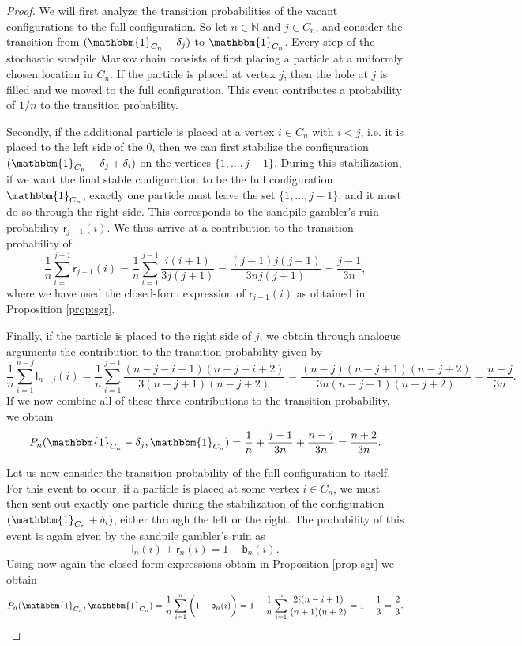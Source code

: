 \documentclass[11pt]{article}
\newcommand{\N}{\mathbb{N}}
\newcommand{\one}{\mathbbm{1}}
\newcommand{\sgrleft}[2]{\mathsf{l}_{#1}(#2)}
\newcommand{\sgrright}[2]{\mathsf{r}_{#1}(#2)}
\newcommand{\sgrboth}[2]{\mathsf{b}_{#1}(#2)}
\newcommand{\trans}[1]{P_{#1}}
\begin{document}
\begin{proof}
    We will first analyze the transition probabilities of the vacant configurations to the full configuration. So let $n\in\N$ and $j\in C_n$, and consider the transition from $(\one_{C_n}-\delta_j)$ to $\one_{C_n}$. Every step of the stochastic sandpile Markov chain consists of first placing a particle at a uniformly chosen location in $C_n$. If the particle is placed at vertex $j$, then the hole at $j$ is filled and we moved to the full configuration. This event contributes a probability of $1/n$ to the transition probability.

    Secondly, if the additional particle is placed at a vertex $i\in C_n$ with $i<j$, i.e. it is placed to the left side of the $0$, then we can first stabilize the configuration $(\one_{C_n}-\delta_j+\delta_i)$ on the vertices $\{1,...,j-1\}.$ During this stabilization, if we want the final stable configuration to be the full configuration $\one_{C_n}$, exactly one particle must leave the set $\{1,...,j-1\}$, and it must do so through the right side. This corresponds to the sandpile gambler's ruin probability $\sgrright{j-1}{i}$. We thus arrive at a contribution to the transition probability of
    $$\frac{1}{n}\sum_{i=1}^{j-1}\sgrright{j-1}{i}=\frac{1}{n}\sum_{i=1}^{j-1}\frac{i(i+1)}{3j(j+1)}=\frac{(j-1)j(j+1)}{3nj(j+1)}=\frac{j-1}{3n},$$
    where we have used the closed-form expression of $\sgrright{j-1}{i}$ as obtained in Proposition \ref{prop:sgr}.

    Finally, if the particle is placed to the right side of $j$, we obtain through analogue arguments the contribution to the transition probability given by
    $$\frac{1}{n}\sum_{i=1}^{n-j}\sgrleft{n-j}{i}=\frac{1}{n}\sum_{i=1}^{j-1}\frac{(n-j-i+1)(n-j-i+2)}{3(n-j+1)(n-j+2)}=\frac{(n-j)(n-j+1)(n-j+2)}{3n(n-j+1)(n-j+2)}=\frac{n-j}{3n}.$$
    If we now combine all of these three contributions to the transition probability, we obtain
    $$\trans{n}(\one_{C_n}-\delta_j,\one_{C_n})=\frac{1}{n}+\frac{j-1}{3n}+\frac{n-j}{3n}=\frac{n+2}{3n}.$$

    Let us now consider the transition probability of the full configuration to itself. For this event to occur, if a particle is placed at some vertex $i\in C_n$, we must then sent out exactly one particle during the stabilization of the configuration $(\one_{C_n}+\delta_i)$, either through the left or the right. The probability of this event is again given by the sandpile gambler's ruin as
    $$\sgrleft{n}{i}+\sgrright{n}{i}=1-\sgrboth{n}{i}.$$
    Using now again the closed-form expressions obtain in Proposition \ref{prop:sgr} we obtain
    $$\trans{n}(\one_{C_n},\one_{C_n})=\frac{1}{n}\sum_{i=1}^n\bigg(1-\sgrboth{n}{i}\bigg)=1-\frac{1}{n}\sum_{i=1}^n\frac{2i(n-i+1)}{(n+1)(n+2)}=1-\frac{1}{3}=\frac{2}{3}.$$
\end{proof}
\end{document}
